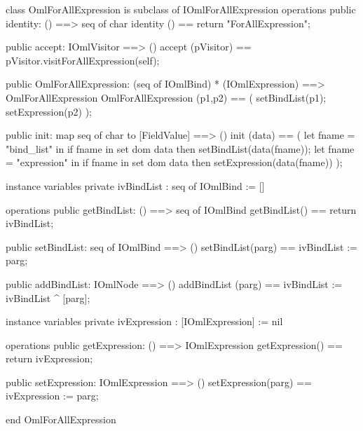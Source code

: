 \begin{vdm_al}
class OmlForAllExpression is subclass of IOmlForAllExpression
operations
  public identity: () ==> seq of char
  identity () == return "ForAllExpression";

  public accept: IOmlVisitor ==> ()
  accept (pVisitor) == pVisitor.visitForAllExpression(self);

  public OmlForAllExpression:
      (seq of IOmlBind) *
      (IOmlExpression) ==> OmlForAllExpression
  OmlForAllExpression (p1,p2) == 
   ( setBindList(p1);
     setExpression(p2) );

  public init: map seq of char to [FieldValue] ==> ()
  init (data) ==
    ( let fname = "bind_list" in
        if fname in set dom data
        then setBindList(data(fname));
      let fname = "expression" in
        if fname in set dom data
        then setExpression(data(fname)) );

instance variables
  private ivBindList : seq of IOmlBind := []

operations
  public getBindList: () ==> seq of IOmlBind
  getBindList() == return ivBindList;

  public setBindList: seq of IOmlBind ==> ()
  setBindList(parg) == ivBindList := parg;

  public addBindList: IOmlNode ==> ()
  addBindList (parg) == ivBindList := ivBindList ^ [parg];

instance variables
  private ivExpression : [IOmlExpression] := nil

operations
  public getExpression: () ==> IOmlExpression
  getExpression() == return ivExpression;

  public setExpression: IOmlExpression ==> ()
  setExpression(parg) == ivExpression := parg;

end OmlForAllExpression
\end{vdm_al}

